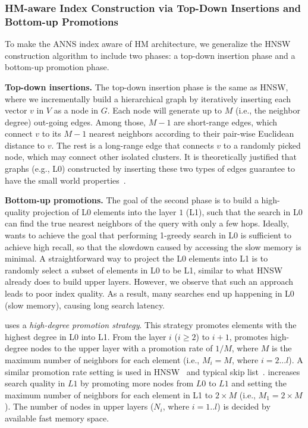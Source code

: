 \subsubsection{HM-aware Index Construction via Top-Down Insertions and Bottom-up Promotions}

To make the ANNS index aware of HM architecture, we generalize the HNSW construction algorithm to include two phases: a top-down insertion phase and a bottom-up promotion phase.

\textbf{Top-down insertions.}
The top-down insertion phase is the same as HNSW, where we incrementally build a hierarchical graph by iteratively inserting each vector $v$ in $V$ as a node in $G$. Each node will generate up to $M$ (i.e., the neighbor degree) out-going edges. Among those, $M - 1$ are short-range edges, which connect $v$ to its $M - 1$ nearest neighbors according to their pair-wise Euclidean distance to $v$. The rest is a long-range edge that connects $v$ to a randomly picked node, which may connect other isolated clusters. It is theoretically justified that graphs (e.g., L0) constructed by inserting these two types of edges guarantee to have the small world properties~\cite{nsg,small-world-dynamics,hnsw}.

\textbf{Bottom-up promotions.} The goal of the second phase is to build a high-quality projection of L0 elements into the layer $1$ (L1), such that the search in L0 can find the true nearest neighbors of the query with only a few hops. Ideally, \algoname wants to achieve the goal that performing 1-greedy search in L0 is sufficient to achieve high recall, so that the slowdown caused by accessing the slow memory is minimal. A straightforward way to project the L0 elements into L1 is to randomly select a subset of elements in L0 to be L1, similar to what HNSW already does to build upper layers. However, we observe that such an approach leads to poor index quality. As a result, many searches end up happening in L0 (slow memory), causing long search latency. 

\algoname uses a \textit{high-degree promotion strategy}. This strategy promotes elements with the highest degree in L0 into L1. 
From the layer $i$ ($i \ge 2$) to $i+1$, \algoname promotes high-degree nodes to the upper layer with a promotion rate of $1/M$, where $M$ is the maximum number of neighbors for each element (i.e., $M_i = M$, where $i=2...l$). A similar promotion rate setting is used in HNSW~\cite{hnsw} and typical skip list~\cite{skip_list}.
\algoname increases search quality in $L1$ by promoting more nodes from $L0$ to $L1$ and setting the maximum number of neighbors for each element in L1 to $2 \times M$ (i.e., $M_1=2 \times M$).  The number of nodes in upper layers ($N_i$, where $i=1..l$) is decided by available fast memory space. 


